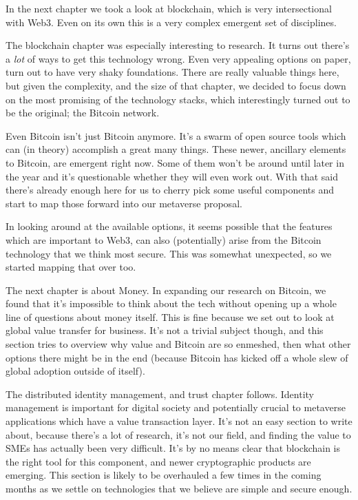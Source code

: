 In the next chapter we took a look at blockchain, which is very intersectional with Web3. Even on its own this is a very complex emergent set of disciplines. \par
The blockchain chapter was especially interesting to research. It turns out there’s a \textit{lot} of ways to get this technology wrong. Even very appealing options on paper, turn out to have very shaky foundations. There are really valuable things here, but given the complexity, and the size of that chapter, we decided to focus down on the most promising of the technology stacks, which interestingly turned out to be the original; the Bitcoin network.\par
Even Bitcoin isn’t just Bitcoin anymore. It’s a swarm of open source tools which can (in theory) accomplish a great many things. These newer, ancillary elements to Bitcoin, are emergent right now. Some of them won’t be around until later in the year and it’s questionable whether they will even work out. With that said there’s already enough here for us to cherry pick some useful components and start to map those forward into our metaverse proposal.\par
In looking around at the available options, it seems possible that the features which are important to Web3, can also (potentially) arise from the Bitcoin technology that we think most secure. This was somewhat unexpected, so we started mapping that over too.\par
The next chapter is about Money. In expanding our research on Bitcoin, we found that it’s impossible to think about the tech without opening up a whole line of questions about money itself. This is fine because we set out to look at global value transfer for business. It’s not a trivial subject though, and this section tries to overview why value and Bitcoin are so enmeshed, then what other options there might be in the end (because Bitcoin has kicked off a whole slew of global adoption outside of itself).\par
The distributed identity management, and trust chapter follows. Identity management is important for digital society and potentially crucial to metaverse applications which have a value transaction layer. It’s not an easy section to write about, because there’s a lot of research, it’s not our field, and finding the value to SMEs has actually been very difficult. It's by no means clear that blockchain is the right tool for this component, and newer cryptographic products are emerging. This section is likely to be overhauled a few times in the coming months as we settle on technologies that we believe are simple and secure enough.\par
